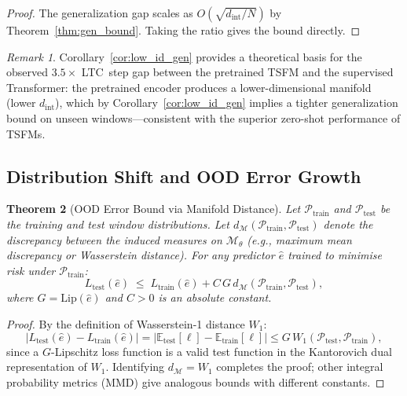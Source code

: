 \documentclass[12pt]{article}
\newtheorem{theorem}{Theorem}[section]
\theoremstyle{definition}
\theoremstyle{remark}
\newtheorem{remark}[theorem]{Remark}
\newcommand{\E}{\mathbb{E}}
\newcommand{\Mset}{\mathcal{M}}
\newcommand{\Pset}{\mathcal{P}}
\newcommand{\abs}[1]{\left| #1 \right|}
\newcommand{\trm}{\mathcal{M}_\theta}
\newcommand{\dint}{d_{\mathrm{int}}}
\newcommand{\Lip}{\mathrm{Lip}}
\begin{document}
\begin{proof}
The generalization gap scales as $O(\sqrt{\dint/N})$ by Theorem~\ref{thm:gen_bound}.
Taking the ratio gives the bound directly.
\end{proof}

\begin{remark}
Corollary~\ref{cor:low_id_gen} provides a theoretical basis for the observed
$3.5\times$ LTC~step gap between the pretrained TSFM and the supervised
Transformer: the pretrained encoder produces a lower-dimensional manifold
(lower $\dint$), which by Corollary~\ref{cor:low_id_gen} implies a tighter
generalization bound on unseen windows---consistent with the superior zero-shot
performance of TSFMs.
\end{remark}

\subsection{Distribution Shift and OOD Error Growth}

\begin{theorem}[OOD Error Bound via Manifold Distance]
\label{thm:ood_error}
Let $\Pset_\mathrm{train}$ and $\Pset_\mathrm{test}$ be the training and
test window distributions. Let $d_\Mset(\Pset_\mathrm{train}, \Pset_\mathrm{test})$
denote the discrepancy between the induced measures on $\trm$
(e.g., maximum mean discrepancy or Wasserstein distance). For any predictor
$\hat{e}$ trained to minimise risk under $\Pset_\mathrm{train}$:
\[
  L_\mathrm{test}(\hat{e})
  \;\leq\; L_\mathrm{train}(\hat{e})
  + C\,G\,d_\Mset(\Pset_\mathrm{train}, \Pset_\mathrm{test}),
\]
where $G = \Lip(\hat{e})$ and $C > 0$ is an absolute constant.
\end{theorem}

\begin{proof}
By the definition of Wasserstein-1 distance $W_1$:
\[
  \abs{L_\mathrm{test}(\hat{e}) - L_\mathrm{train}(\hat{e})}
  = \abs{\E_\mathrm{test}[\ell] - \E_\mathrm{train}[\ell]}
  \leq G\,W_1(\Pset_\mathrm{test}, \Pset_\mathrm{train}),
\]
since a $G$-Lipschitz loss function is a valid test function in the
Kantorovich dual representation of $W_1$. Identifying
$d_\Mset = W_1$ completes the proof; other integral probability metrics
(MMD) give analogous bounds with different constants.
\end{proof}
\end{document}

